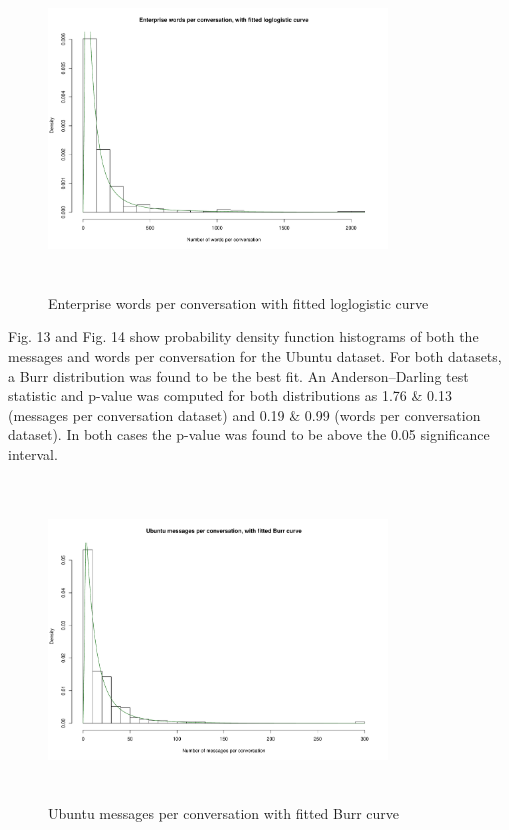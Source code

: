 \documentclass[conference]{IEEEtran}
\begin{document}
\begin{figure}
\begin{center}
\includegraphics[height=8.5cm, width=9cm]{12_words_enterprise.pdf} 
\caption{Enterprise words per conversation with fitted loglogistic curve}
\end{center}
\label{fig:interarrival_ent}
\end{figure}

Fig. 13 and Fig. 14 show probability density function histograms of both the messages and words per conversation for the Ubuntu dataset. 
For both datasets, a Burr distribution was found to be the best fit. An Anderson--Darling test statistic and p-value was computed for both distributions as 1.76 \& 0.13 (messages per conversation dataset) and 0.19 \&  0.99 (words per conversation dataset). In both cases the p-value was found to be above the 0.05 significance interval.

\begin{figure}
\begin{center}
\includegraphics[height=8.5cm, width=9cm]{13_messages_ubuntu.pdf} 
\caption{Ubuntu messages per conversation with fitted Burr curve}
\end{center}
\label{fig:interarrival_ubun}
\end{figure}
\end{document}

